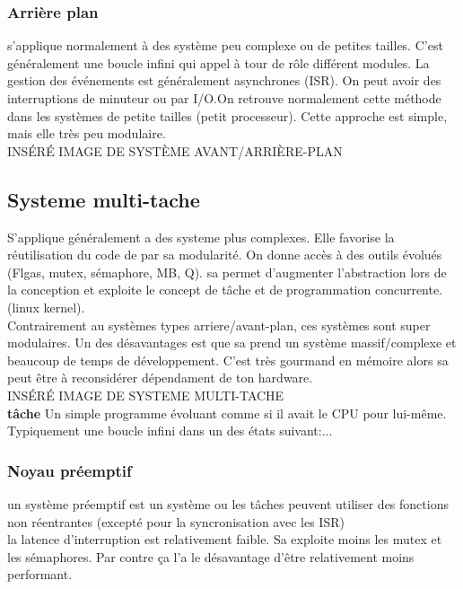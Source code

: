\documentclass[oneside]{book}
\begin{document}
    \subsubsection{Arrière plan}
    s'applique normalement à des système peu complexe ou de petites tailles. C'est généralement une boucle infini qui appel à tour de rôle différent modules. La gestion des événements est généralement asynchrones (ISR). On peut avoir des interruptions de minuteur ou par I/O.On retrouve normalement cette méthode dans les systèmes de petite tailles (petit processeur). Cette approche est simple, mais elle très peu modulaire.\\
    
    INSÉRÉ IMAGE DE SYSTÈME AVANT/ARRIÈRE-PLAN\\
    
    \subsection{Systeme multi-tache}
    S'applique généralement a des systeme plus complexes. Elle favorise la réutilisation du code de par sa modularité. On donne accès à des outils évolués (Flgas, mutex, sémaphore, MB, Q). sa permet d'augmenter l'abstraction lors de la conception et exploite le concept de tâche et de programmation concurrente. (linux kernel).\\
    
    Contrairement au systèmes types arriere/avant-plan, ces systèmes sont super modulaires. Un des désavantages est que sa prend un système massif/complexe et beaucoup de temps de développement. C'est très gourmand en mémoire alors sa peut être à reconsidérer dépendament de ton hardware.\\
    
    INSÉRÉ IMAGE DE SYSTEME MULTI-TACHE\\
    
    \textbf{tâche} Un simple programme évoluant comme si il avait le CPU pour lui-même. Typiquement une boucle infini dans un des états suivant:...\\
    \subsubsection{Noyau préemptif}
    un système préemptif est un système ou les tâches peuvent utiliser des fonctions non réentrantes (excepté pour la syncronisation avec les ISR)\\
    
    la latence d'interruption est relativement faible. Sa exploite moins les mutex et les sémaphores. Par contre ça l'a le désavantage d'être relativement moins performant.\\
    
\end{document}

